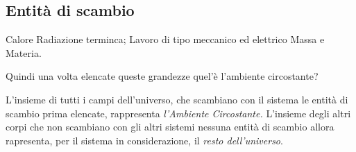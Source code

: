 \documentclass{book}
\begin{document}
\subsection{Entità di scambio}
\begin{tasks}
    \task Calore
    \task Radiazione terminca;
    \task Lavoro di tipo meccanico ed elettrico
    \task Massa e Materia.
\end{tasks}
\begin{center}
  Quindi una volta elencate queste grandezze quel'è l'ambiente circostante?
\end{center}
L'insieme di tutti i campi dell'universo, che scambiano con il sistema le entità
di scambio prima elencate, rappresenta {\it l'Ambiente Circostante.} L'insieme degli
altri corpi che non scambiano con gli altri sistemi nessuna entità di scambio allora
rapresenta, per il sistema in considerazione, il {\it resto dell'universo}.
\end{document}
